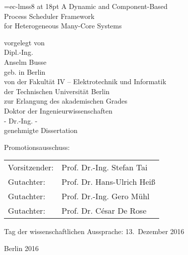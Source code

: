 \begin{titlepage}\sffamily
	\begin{center}
		\begin{huge}
			\font\testa=ec-lmss8 at 18pt
			{\testa A Dynamic and Component-Based \\ Process Scheduler Framework \\for Heterogeneous Many-Core Systems}
			
		\end{huge}
		
		\vfill
		\vfill
		
		\begin{Large}
		vorgelegt von \\
		Dipl.-Ing. \\
		Anselm Busse \\
		geb. in Berlin \\
		\vfill
		von der Fakultät IV -- Elektrotechnik und Informatik \\
		der Technischen Universität Berlin \\
		zur Erlangung des akademischen Grades \\
		\bigbreak
		Doktor der Ingenieurwissenschaften \\
		- Dr.-Ing. - \\
		\bigbreak
		genehmigte Dissertation
		\end{Large}
	\end{center}
	
	\vfill
	\vfill
	\vfill
	
	\begin{Large}
	Promotionsausschuss:
	\end{Large}
	\bigbreak
	\begin{large}
	\begin{tabular}{ll}
		Vorsitzender:	& Prof. Dr.-Ing. Stefan Tai \\
		Gutachter:		& Prof. Dr. Hans-Ulrich Hei\ss \\
		Gutachter:		& Prof. Dr.-Ing. Gero M\"{u}hl \\
		Gutachter:		& Prof. Dr. C\'{e}sar De Rose \\
	\end{tabular}
	\end{large}
	\bigbreak
	\begin{Large}
	Tag der wissenschaftlichen Aussprache: 13.~Dezember 2016
	\end{Large}
	\vspace{2cm}
	\begin{center}
		\begin{large}
		Berlin 2016
		\end{large}
	\end{center}
\end{titlepage}

